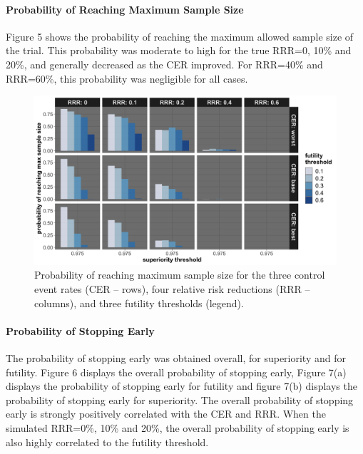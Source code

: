 \documentclass[]{article}
\let\oldparagraph\paragraph
\renewcommand{\paragraph}[1]{\oldparagraph{#1}\mbox{}}
\begin{document}
\hypertarget{probability-of-reaching-maximum-sample-size}{%
\paragraph{Probability of Reaching Maximum Sample
Size}\label{probability-of-reaching-maximum-sample-size}}

Figure 5 shows the probability of reaching the maximum allowed sample
size of the trial. This probability was moderate to high for the true
RRR=0, 10\% and 20\%, and generally decreased as the CER improved. For
RRR=40\% and RRR=60\%, this probability was negligible for all cases.

\begin{figure}
  \caption{Probability of reaching maximum sample size for the three control event rates (CER – rows), four relative
  risk reductions (RRR – columns), and three futility thresholds (legend).}
  \includegraphics{../p1_plots/batch_size_nb_1000/prob_reach_max_size_p1.png}
\end{figure}

\hypertarget{probability-of-stopping-early}{%
\paragraph{Probability of Stopping
Early}\label{probability-of-stopping-early}}

The probability of stopping early was obtained overall, for superiority
and for futility. Figure 6 displays the overall probability of stopping
early, Figure 7(a) displays the probability of stopping early for
futility and figure 7(b) displays the probability of stopping early for
superiority. The overall probability of stopping early is strongly
positively correlated with the CER and RRR. When the simulated RRR=0\%,
10\% and 20\%, the overall probability of stopping early is also highly
correlated to the futility threshold.
\end{document}
